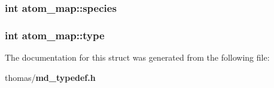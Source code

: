 \subsubsection{\setlength{\rightskip}{0pt plus 5cm}int {\bf atom\_\-map::species}}\label{structatom__map_6c5ad52e5f34535ebf160928be8cf546}


\subsubsection{\setlength{\rightskip}{0pt plus 5cm}int {\bf atom\_\-map::type}}\label{structatom__map_f4061a1d8da69f082007d81467467934}




The documentation for this struct was generated from the following file:\begin{CompactItemize}
\item 
thomas/{\bf md\_\-typedef.h}\end{CompactItemize}
